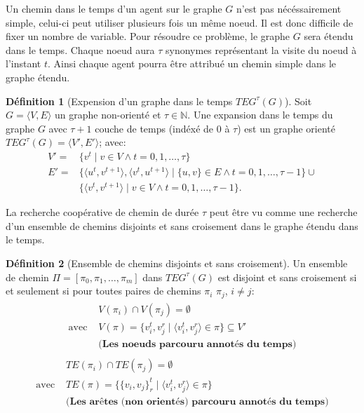 \documentclass[french, 10pt, letterpaper]{article}
\theoremstyle{definition}
\newtheorem{definition}{Définition}[subsection]
\theoremstyle{proposition}
\theoremstyle{example}
\begin{document}
    Un chemin dans le temps d'un agent sur le graphe $G$ n'est pas nécéssairement simple, celui-ci peut utiliser plusieurs fois un même noeud.
    Il est donc difficile de fixer un nombre de variable.
    Pour résoudre ce problème, le graphe $G$ sera étendu dans le temps. 
    Chaque noeud aura $\tau$ synonymes représentant la visite du noeud à l'instant $t$.
    Ainsi chaque agent pourra être attribué un chemin simple dans le graphe étendu.

    \begin{definition}[Expension d'un graphe dans le temps $TEG^\tau(G)$]
        Soit $G = \langle V, E \rangle$ un graphe non-orienté et $\tau\in \mathbb{N}$. 
        Une expansion dans le temps du graphe $G$ avec $\tau + 1$ couche de temps (indéxé de $0$ à $\tau$) est un graphe orienté
        $TEG^\tau(G) = \langle V', E' \rangle$; avec:
        \begin{align*}
            V' = &\{v^t\;|\;v \in V \land t = 0, 1, \ldots, \tau\}\\
            E' = &\{\langle u^t, v^{t+1} \rangle, \langle v^t, u^{t+1} \rangle\;|\;\{u, v\}\in E \land t= 0, 1, \ldots, \tau - 1\} \cup\\
            &\{\langle v^t, v^{t+1} \rangle\;|\;v\in V \land t= 0, 1, \ldots, \tau - 1\}.
        \end{align*} 
    \end{definition}

    La recherche coopérative de chemin de durée $\tau$ peut être vu comme une recherche d'un ensemble de chemins disjoints et sans croisement
    dans le graphe étendu dans le temps.

    \begin{definition}[Ensemble de chemins disjoints et sans croisement]
        Un ensemble de chemin $\Pi = [\pi_0, \pi_1, \ldots, \pi_m]$ dans $TEG^\tau(G)$ est disjoint et sans croisement si et seulement si
        pour toutes paires de chemins $\pi_i$ $\pi_j$, $i \neq j$:
        \begin{gather}
            \label{def:chemindisjoint}
            \begin{split}
            &V(\pi_i) \cap V(\pi_j) = \emptyset\\
            \text{avec } &V(\pi) = \{v_i^t, v_j^r\;|\;\langle v_i^t, v_j^r \rangle \in \pi\} \subseteq V'\\
            &\textbf{(Les noeuds parcouru annotés du temps)}
            \end{split}
        \end{gather}
        \begin{gather}
            \label{def:chemincroisement}
            \begin{split}
            &TE(\pi_i) \cap TE(\pi_j) = \emptyset\\
            \text{avec } &TE(\pi) = \{\{v_i, v_j\}^t_r  \;|\; \langle v_i^t, v_j^r \rangle \in \pi \}\\
            &\textbf{(Les arêtes (non orientés) parcouru annotés du temps)}
            \end{split}
        \end{gather}
    \end{definition}
\end{document}
